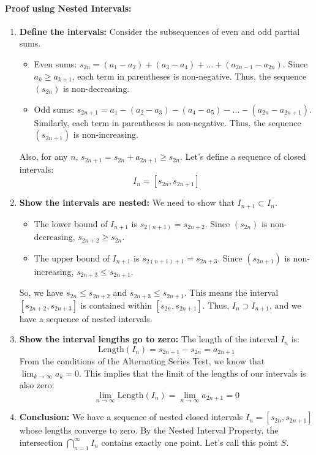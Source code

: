 \documentclass[12pt,a4paper]{article}
\theoremstyle{definition}
\theoremstyle{remark}
\begin{document}
\paragraph{Proof using Nested Intervals:}
\begin{enumerate}
    \item \textbf{Define the intervals:}
    Consider the subsequences of even and odd partial sums.
    \begin{itemize}
        \item Even sums: $s_{2n} = (a_1 - a_2) + (a_3 - a_4) + \dots + (a_{2n-1} - a_{2n})$. Since $a_k \ge a_{k+1}$, each term in parentheses is non-negative. Thus, the sequence $(s_{2n})$ is non-decreasing.
        \item Odd sums: $s_{2n+1} = a_1 - (a_2 - a_3) - (a_4 - a_5) - \dots - (a_{2n} - a_{2n+1})$. Similarly, each term in parentheses is non-negative. Thus, the sequence $(s_{2n+1})$ is non-increasing.
    \end{itemize}
    Also, for any $n$, $s_{2n+1} = s_{2n} + a_{2n+1} \ge s_{2n}$.
    Let's define a sequence of closed intervals:
    \[ I_n = [s_{2n}, s_{2n+1}] \]

    \item \textbf{Show the intervals are nested:}
    We need to show that $I_{n+1} \subset I_n$.
    \begin{itemize}
        \item The lower bound of $I_{n+1}$ is $s_{2(n+1)} = s_{2n+2}$. Since $(s_{2n})$ is non-decreasing, $s_{2n+2} \ge s_{2n}$.
        \item The upper bound of $I_{n+1}$ is $s_{2(n+1)+1} = s_{2n+3}$. Since $(s_{2n+1})$ is non-increasing, $s_{2n+3} \le s_{2n+1}$.
    \end{itemize}
    So, we have $s_{2n} \le s_{2n+2}$ and $s_{2n+3} \le s_{2n+1}$. This means the interval $[s_{2n+2}, s_{2n+3}]$ is contained within $[s_{2n}, s_{2n+1}]$. Thus, $I_n \supset I_{n+1}$, and we have a sequence of nested intervals.

    \item \textbf{Show the interval lengths go to zero:}
    The length of the interval $I_n$ is:
    \[ \text{Length}(I_n) = s_{2n+1} - s_{2n} = a_{2n+1} \]
    From the conditions of the Alternating Series Test, we know that $\lim_{k\to\infty} a_k = 0$.
    This implies that the limit of the lengths of our intervals is also zero:
    \[ \lim_{n\to\infty} \text{Length}(I_n) = \lim_{n\to\infty} a_{2n+1} = 0 \]

    \item \textbf{Conclusion:}
    We have a sequence of nested closed intervals $I_n = [s_{2n}, s_{2n+1}]$ whose lengths converge to zero. By the Nested Interval Property, the intersection $\bigcap_{n=1}^{\infty} I_n$ contains exactly one point. Let's call this point $S$.


\end{enumerate}
\end{document}
